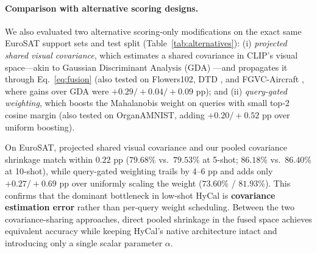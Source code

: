 \documentclass[letterpaper]{article} %
\begin{document}
\paragraph{Comparison with alternative scoring designs.}
We also evaluated two alternative scoring-only modifications on the exact same EuroSAT support sets and test split (Table~\ref{tab:alternatives}): (i) \textit{projected shared visual covariance}, which estimates a shared covariance in CLIP's visual space---akin to Gaussian Discriminant Analysis (GDA) \citep{wang2024gda}---and propagates it through Eq.~\eqref{eq:fusion} (also tested on Flowers102, DTD \citep{cimpoi2014dtd}, and FGVC-Aircraft \citep{maji2013aircraft}, where gains over GDA were $+0.29 / +0.04 / +0.09$ pp); and (ii) \textit{query-gated weighting}, which boosts the Mahalanobis weight on queries with small top-2 cosine margin (also tested on OrganAMNIST, adding $+0.20 / +0.52$ pp over uniform boosting).

On EuroSAT, projected shared visual covariance and our pooled covariance shrinkage match within $0.22$ pp ($79.68\%$ vs.\ $79.53\%$ at 5-shot; $86.18\%$ vs.\ $86.40\%$ at 10-shot), while query-gated weighting trails by 4--6 pp and adds only $+0.27 / +0.69$ pp over uniformly scaling the weight ($73.60\%$ / $81.93\%$). This confirms that the dominant bottleneck in low-shot HyCal is \textbf{covariance estimation error} rather than per-query weight scheduling. Between the two covariance-sharing approaches, direct pooled shrinkage in the fused space achieves equivalent accuracy while keeping HyCal's native architecture intact and introducing only a single scalar parameter $\alpha$.
\end{document}
